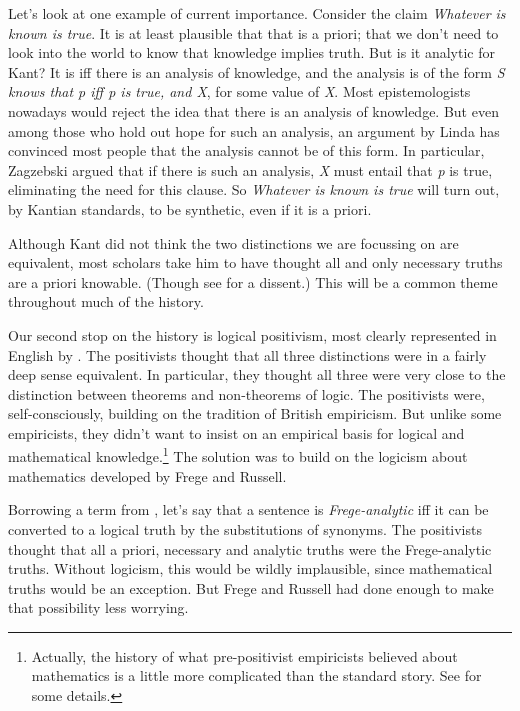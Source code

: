 Let's look at one example of current importance. Consider the claim \emph{Whatever is known is true}. It is at least plausible that that is a priori; that we don't need to look into the world to know that knowledge implies truth. But is it analytic for Kant? It is iff there is an analysis of knowledge, and the analysis is of the form \emph{S knows that p iff p is true, and X}, for some value of \emph{X}. Most epistemologists nowadays would reject the idea that there is an analysis of knowledge. But even among those who hold out hope for such an analysis, an argument by Linda  \citet{Zagzebski1994} has convinced most people that the analysis cannot be of this form. In particular, Zagzebski argued that if there is such an analysis, \emph{X} must entail that \emph{p} is true, eliminating the need for this clause. So \emph{Whatever is known is true} will turn out, by Kantian standards, to be synthetic, even if it is a priori.

Although Kant did not think the two distinctions we are focussing on are equivalent, most scholars take him to have thought all and only necessary truths are a priori knowable. (Though see  \citet{Strang2011} for a dissent.) This will be a common theme throughout much of the history.

Our second stop on the history is logical positivism, most clearly represented in English by  \citet{Ayer1936}. The positivists thought that all three distinctions were in a fairly deep sense equivalent. In particular, they thought all three were very close to the distinction between theorems and non-theorems of logic. The positivists were, self-consciously, building on the tradition of British empiricism. But unlike some empiricists, they didn't want to insist on an empirical basis for logical and mathematical knowledge.\footnote{Actually, the history of what pre-positivist empiricists believed about mathematics is a little more complicated than the standard story. See  \citet{Whitmore1945} for some details.} The solution was to build on the logicism about mathematics developed by Frege and Russell.

Borrowing a term from  \citet{Boghossian1996-BOGAR}, let's say that a sentence is \emph{Frege-analytic} iff it can be converted to a logical truth by the substitutions of synonyms. The positivists thought that all a priori, necessary and analytic truths were the Frege-analytic truths. Without logicism, this would be wildly implausible, since mathematical truths would be an exception. But Frege and Russell had done enough to make that possibility less worrying.


